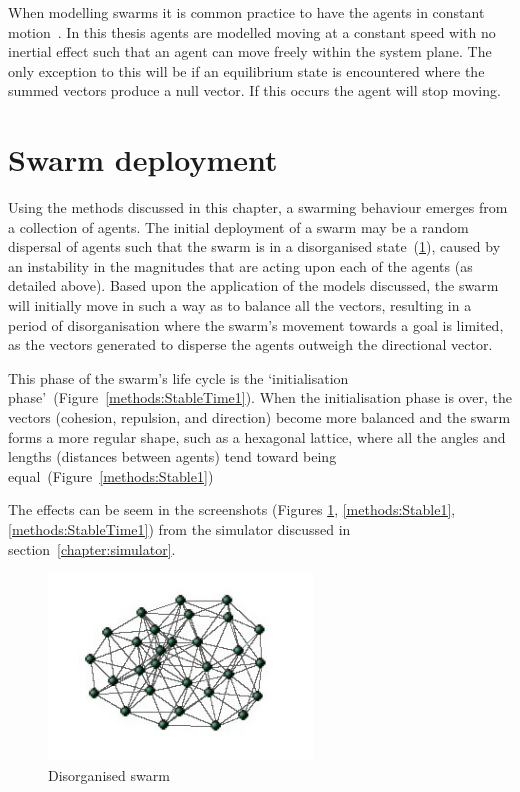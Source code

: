 When modelling swarms it is common practice to have the agents in constant motion~\cite{LCW:07, GKF:13}. In this thesis agents are modelled moving at a constant speed with no inertial effect such that an agent can move freely within the system plane. The only exception to this will be if an equilibrium state is encountered where the summed vectors produce a null vector. If this occurs the agent will stop moving.

\section{Swarm deployment}

Using the methods discussed in this chapter, a swarming behaviour emerges from
a collection of agents. The initial deployment of a swarm may be a random
dispersal of agents such that the swarm is in a disorganised
state~(\ref{methods:Chaos1}), caused by an instability in the magnitudes that
are acting upon each of the agents (as detailed above). Based upon the
application of the models discussed, the swarm will initially move in such a
way as to balance all the vectors, resulting in a period of disorganisation
where the swarm's movement towards a goal is limited, as the vectors generated
to disperse the agents outweigh the directional vector. 

This phase of the swarm's life cycle is the `initialisation
phase'~(Figure~\ref{methods:StableTime1}). When the initialisation phase is
over, the vectors (cohesion, repulsion, and direction) become more balanced and
the swarm forms a more regular shape, such as a hexagonal lattice, where all
the angles and lengths (distances between agents) tend toward being
equal~(Figure~\ref{methods:Stable1})

The effects can be seem in the screenshots (Figures \ref{methods:Chaos1},
\ref{methods:Stable1}, \ref{methods:StableTime1}) from the simulator discussed
in section~\ref{chapter:simulator}.

\begin{figure}[H]
\begin{center}
\includegraphics[width=7cm]{CHAPTER-2/figures/Chaos}
\end{center}
\caption{Disorganised swarm\label{methods:Chaos1}}
\end{figure}

